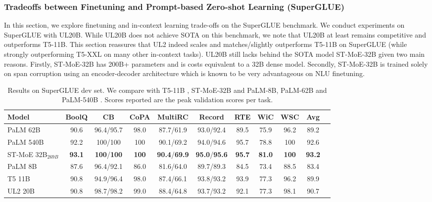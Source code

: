 \documentclass[10pt]{article}
\begin{document}
\subsubsection{Tradeoffs between Finetuning and Prompt-based Zero-shot Learning (SuperGLUE)}
In this section, we explore finetuning and in-context learning trade-offs on the SuperGLUE benchmark. 
We conduct experiments on SuperGLUE with UL20B. While UL20B does not achieve SOTA on this benchmark, we note that UL20B at least remains competitive and outperforms T5-11B. This section reassures that UL2 indeed scales and matches/slightly outperforms T5-11B on SuperGLUE (while strongly outperforming T5-XXL on many other in-context tasks). UL20B still lacks behind the SOTA model ST-MoE-32B given two main reasons. Firstly, ST-MoE-32B has 200B+ parameters and is costs equivalent to a 32B dense model. Secondly, ST-MoE-32B is trained solely on span corruption using an encoder-decoder architecture which is known to be very advantageous on NLU finetuning.

\begin{table}[h!]
    \centering
    \small
        \caption{Results on SuperGLUE dev set. We compare with T5-11B \citep{raffel2019exploring}, ST-MoE-32B \citep{zoph2022designing} and PaLM-8B, PaLM-62B and PaLM-540B \citep{chowdhery2022palm}. Scores reported are the peak validation scores per task.}
    \label{tab:finetune-superglue}
    \begin{tabular}{lcccccccccc}
    \toprule
  Model      & BoolQ & CB & CoPA & MultiRC & Record & RTE & WiC & WSC & Avg   \\
  \midrule
  PaLM 62B & 90.6 & 96.4/95.7  & 98.0 & 87.7/61.9 & 93.0/92.4 &  89.5 & 75.9 & 96.2 & 89.2  \\
      PaLM 540B & 92.2 & 100/100 & 100 & 90.1/69.2 & 94.0/94.6 & 95.7 & 78.8 & 100  & 92.6 \\
     ST-MoE 32B$_{269B}$  & \textbf{93.1} & \textbf{100}/\textbf{100} & \textbf{100} & \textbf{90.4}/\textbf{69.9} & \textbf{95.0}/\textbf{95.6} & \textbf{95.7} & \textbf{81.0} & \textbf{100} & \textbf{93.2} \\
     \midrule 
     PaLM 8B  & 87.6 & 96.4/92.1 & 86.0 & 81.6/64.0 & 89.7/89.3 & 84.5 & 73.4 & 88.5 & 83.4\\
    T5 11B      & 90.8 & 94.9/96.4 & 98.0 & 87.4/66.1 & 93.8/93.2 & 93.9 & 77.3 & 96.2 & 89.9 \\
     UL2 20B & 90.8 & 98.7/98.2 & 99.0 & 88.4/64.8 & 93.7/93.2 & 92.1 & 77.3 & 98.1 &  90.7  \\
         \bottomrule
    \end{tabular}
\end{table}
  
\end{document}
